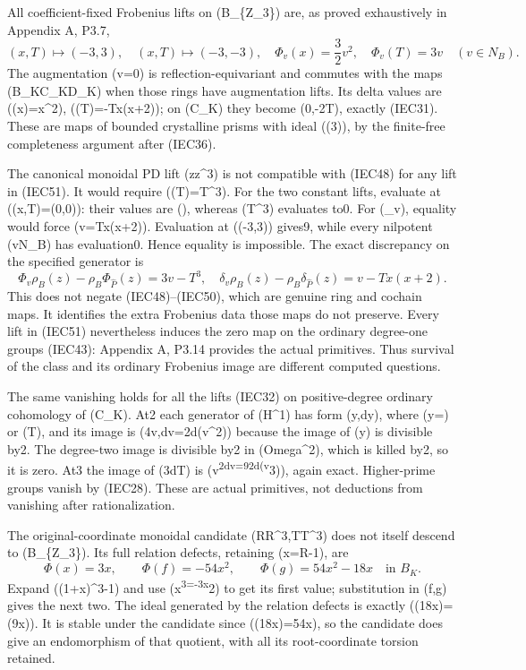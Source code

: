 \documentclass[
  10pt,
]{article}
\begin{document}
All coefficient-fixed Frobenius lifts on (B\_\{\mathbb Z\_3\}) are, as
proved exhaustively in Appendix A, P3.7, \[
(x,T)\mapsto(-3,3),\quad(x,T)\mapsto(-3,-3),\quad
\Phi_v(x)=\frac32v^2,\quad\Phi_v(T)=3v\quad(v\in N_B).
\tag{IEC51}
\] The augmentation (v=0) is reflection-equivariant and commutes with
the maps (B\_K\to C\_K\to D\_K) when those rings have augmentation
lifts. Its delta values are (\delta(x)=x\^{}2), (\delta(T)=-Tx(x+2)); on
(C\_K) they become (0,-2\epsilon T), exactly (IEC31). These are maps of
bounded crystalline prisms with ideal ((3)), by the finite-free
completeness argument after (IEC36).

The canonical monoidal PD lift (z\mapsto z\^{}3) is not compatible with
(IEC48) for any lift in (IEC51). It would require (\Phi(T)=T\^{}3). For
the two constant lifts, evaluate at ((x,T)=(0,0)): their values are
(), whereas (T\^{}3) evaluates to0. For (\Phi\_v), equality would
force (v=Tx(x+2)). Evaluation at ((-3,3)) gives9, while every nilpotent
(v\in N\_B) has evaluation0. Hence equality is impossible. The exact
discrepancy on the specified generator is \[
\Phi_v\rho_B(z)-\rho_B\Phi_{\widehat P}(z)
=3v-T^3,
\quad
\delta_v\rho_B(z)-\rho_B\delta_{\widehat P}(z)
=v-Tx(x+2).
\tag{IEC52}
\] This does not negate (IEC48)--(IEC50), which are genuine ring and
cochain maps. It identifies the extra Frobenius data those maps do not
preserve. Every lift in (IEC51) nevertheless induces the zero map on the
ordinary degree-one groups (IEC43): Appendix A, P3.14 provides the
actual primitives. Thus survival of the class and its ordinary Frobenius
image are different computed questions.

The same vanishing holds for all the lifts (IEC32) on positive-degree
ordinary cohomology of (C\_K). At2 each generator of (H\^{}1) has form
(y,dy), where (y=\epsilon) or (T), and its image is (4v,dv=2d(v\^{}2))
because the image of (y) is divisible by2. The degree-two image is
divisible by2 in (Omega\^{}2), which is killed by2, so it is zero. At3
the image of (3\epsilon dT) is
(v\textsuperscript{2dv=\frac92d(v}3)), again exact.
Higher-prime groups vanish by (IEC28). These are actual primitives, not
deductions from vanishing after rationalization.

The original-coordinate monoidal candidate
(R\mapsto R\^{}3,T\mapsto T\^{}3) does not itself descend to
(B\_\{\mathbb Z\_3\}). Its full relation defects, retaining (x=R-1), are
\[
\Phi(x)=3x,\qquad
\Phi(f)=-54x^2,\qquad \Phi(g)=54x^2-18x
\quad\text{in }B_K.
\tag{IEC56}
\] Expand ((1+x)\^{}3-1) and use (x\textsuperscript{3=-3x}2) to get its
first value; substitution in (f,g) gives the next two. The ideal
generated by the relation defects is exactly ((18x)=(9x)). It is stable
under the candidate since (\Phi(18x)=54x), so the candidate does give an
endomorphism of that quotient, with all its root-coordinate torsion
retained.
\end{document}
